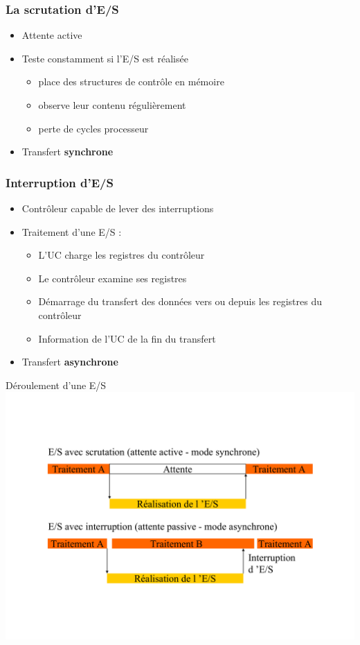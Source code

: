 \begin{frame}
\frametitle{La scrutation d'E/S}
\begin{itemize}
\item Attente active
\item Teste constamment si l'E/S est réalisée
\begin{itemize}
\item place des structures de contrôle en mémoire
\item observe leur contenu régulièrement
\item perte de cycles processeur
\end{itemize}
\item Transfert \textbf{synchrone}
\end{itemize}
\end{frame}


\begin{frame}
\frametitle{Interruption d’E/S}
\begin{itemize}
\item Contrôleur capable de lever des interruptions
\item Traitement d’une E/S :
\begin{itemize}
\item L’UC charge les registres du contrôleur
\item Le contrôleur examine ses registres
\item Démarrage du transfert des données vers ou depuis les registres du contrôleur
\item Information de l’UC de la fin du transfert
\end{itemize}
\item Transfert \textbf{asynchrone}
\end{itemize}
\end{frame}


\begin{frame}{Déroulement d'une E/S}
\includegraphics[width=\textwidth]{../illustration/Interruption_ES.pdf}
\end{frame}


